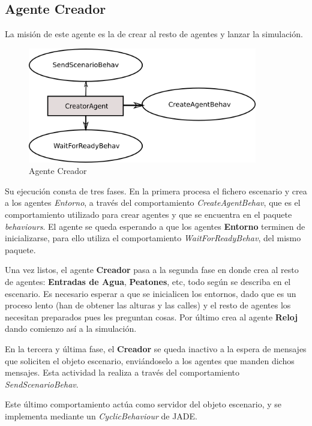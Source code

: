 \subsection*{Agente Creador}

La misión de este agente es la de crear al resto de agentes y lanzar la
simulación.

\begin{figure}[H]
 \centering
 \includegraphics[width=100mm]{figuras/cap5/ag_creator.png}
 \caption{Agente Creador}
\end{figure}

Su ejecución consta de tres fases. En la primera procesa el fichero escenario y
crea a los agentes {\em Entorno}, a través del comportamiento {\em
CreateAgentBehav}, que es el comportamiento utilizado para crear agentes y que
se encuentra en el paquete {\em behaviours}. El agente se queda esperando a que
los agentes {\bf Entorno} terminen de inicializarse, para ello utiliza el
comportamiento {\em WaitForReadyBehav}, del mismo paquete.

Una vez listos, el agente {\bf Creador} pasa a la segunda fase en donde crea al
resto de agentes: {\bf Entradas de Agua}, {\bf Peatones}, etc, todo según se
describa en el escenario. Es necesario esperar a que se inicialicen los
entornos, dado que es un proceso lento (han de obtener las alturas y las
calles) y el resto de agentes los necesitan preparados pues les preguntan cosas.
Por último crea al agente {\bf Reloj} dando comienzo así a la simulación.

En la tercera y última fase, el {\bf Creador} se queda inactivo a la espera de
mensajes que soliciten el objeto escenario, enviándoselo a los agentes que
manden dichos mensajes. Esta actividad la realiza a través del comportamiento
{\em SendScenarioBehav}.

Este último comportamiento actúa como servidor del objeto escenario, y se
implementa mediante un {\em CyclicBehaviour} de JADE.


